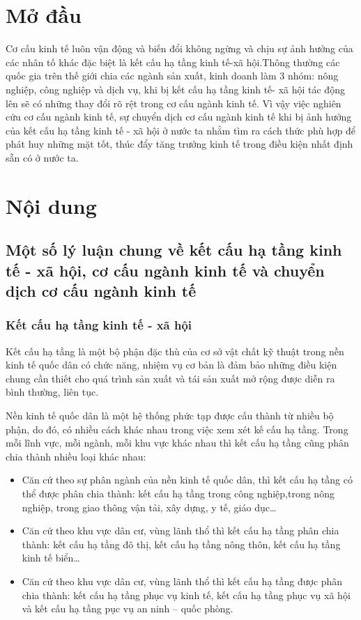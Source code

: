 \tableofcontents
\pagestyle{fancy}
\chapter{Mở đầu}
 Cơ cấu kinh tế luôn vận động và biến đổi không ngừng và chịu sự ảnh hưởng của các nhân tố khác đặc biệt là kết cấu hạ tầng kinh tế-xã hội.Thông thường các quốc gia trên thế giới chia các ngành sản xuất, kinh doanh làm 3 nhóm: nông nghiệp, công nghiệp và dịch vụ, khi bị kết cấu hạ tầng kinh tế- xã hội tác động lên sẽ có những thay đổi rõ rệt trong cơ cấu ngành kinh tế. Vì vậy việc nghiên cứu  cơ cấu ngành kinh tế, sự chuyển dịch cơ cấu ngành kinh tế khi bị ảnh hưởng của kết cấu hạ tầng kinh tế - xã hội ở nước ta nhằm tìm ra cách thức phù hợp để phát huy những mặt tốt, thúc đẩy tăng trưởng kinh tế  trong điều kiện nhất định sẵn có ở nước ta.

\chapter{Nội dung}
\section[Lý luận chung]{Một số lý luận chung về kết cấu hạ tầng kinh tế - xã hội, cơ cấu ngành kinh tế và chuyển dịch cơ cấu ngành kinh tế}
\subsection{Kết cấu hạ tầng kinh tế - xã hội}
Kết cấu hạ tầng là một bộ phận đặc thù của cơ sở vật chất kỹ thuật trong nền kinh tế quốc dân có chức năng, nhiệm vụ cơ bản là đảm bảo những điều kiện chung cần thiết cho quá trình sản xuất và tái sản xuất mở rộng được diễn ra bình thường, liên tục.

Nền kinh tế quốc dân là một hệ thống phức tạp được cấu thành từ nhiều bộ phận, do đó, có nhiều cách khác nhau trong việc xem xét kế cấu hạ tầng. Trong mỗi lĩnh vực, mỗi ngành, mỗi khu vực khác nhau thì kết cấu hạ tầng cũng phân chia thành nhiều loại khác nhau:

\begin{itemize}
\item Căn cứ theo sự phân ngành của nền kinh tế quốc dân, thì kết cấu hạ tầng có thể được phân chia thành: kết cấu hạ tầng trong công nghiệp,trong nông nghiệp, trong giao thông vận tải, xây dựng, y tế, giáo dục…
\item Căn cứ theo khu vực dân cư, vùng lãnh thổ thì kết cấu hạ tầng phân chia thành: kết cấu hạ tầng đô thị, kết cấu hạ tầng nông thôn, kết cấu hạ tầng kinh tế biển…
\item Căn cứ theo khu vực dân cư, vùng lãnh thổ thì kết cấu hạ tầng được phân chia thành: kết cấu hạ tầng phục vụ kinh tế, kết cấu hạ tầng phục vụ xã hội và kết cấu hạ tầng pục vụ an ninh – quốc phòng.
\end{itemize}


